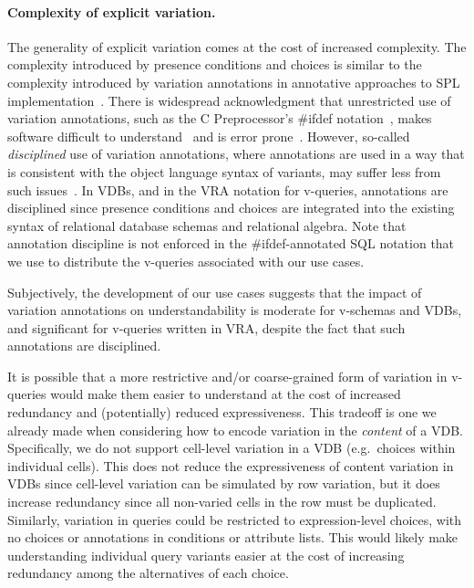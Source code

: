 \paragraph{Complexity of explicit variation.}
%
The generality of explicit variation comes at the cost of increased complexity.
The complexity introduced by presence conditions and choices is similar to the
complexity introduced by variation annotations in annotative approaches to SPL
implementation~\cite{KAK08}. There is widespread acknowledgment that
unrestricted use of variation annotations, such as the C Preprocessor's \#ifdef
notation~\cite{cpp}, makes software difficult to understand~\cite{LWE11vl} and
is error prone~\cite{FMKPA:SPLC16}.
%
However, so-called \emph{disciplined} use of variation annotations, where
annotations are used in a way that is consistent with the object language
syntax of variants, may suffer less from such issues~\cite{LKA:AOSD11}. In
VDBs, and in the VRA notation for v-queries, annotations are disciplined since
presence conditions and choices are integrated into the existing syntax of
relational database schemas and relational algebra.
%
Note that annotation discipline is not enforced in the \#ifdef-annotated SQL
notation that we use to distribute the v-queries associated with our use cases.


Subjectively, the development of our use cases suggests that the impact
of variation annotations on understandability is moderate for v-schemas and
VDBs, and significant for v-queries written in VRA, despite the fact that such
annotations are disciplined.
%
%


It is possible that a more restrictive and/or coarse-grained form of variation
in v-queries would make them easier to understand at the cost of increased
redundancy and (potentially) reduced expressiveness.
%
This tradeoff is one we already made when considering how to encode variation
in the \emph{content} of a VDB. Specifically, we do not support cell-level
variation in a VDB (e.g.\ choices within individual cells). This does not
reduce the expressiveness of content variation in VDBs since cell-level
variation can be simulated by row variation, but it does increase redundancy
since all non-varied cells in the row must be duplicated.
%
Similarly, variation in queries could be restricted to expression-level
choices, with no choices or annotations in conditions or attribute lists. This
would likely make understanding individual query variants easier at the cost of
increasing redundancy among the alternatives of each choice.


